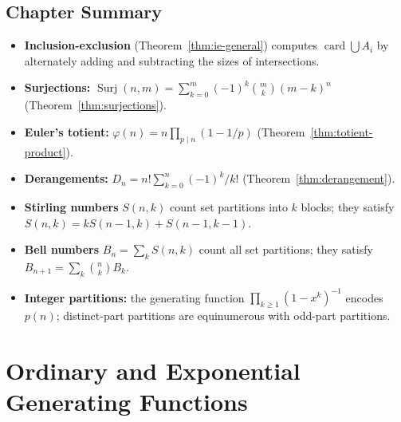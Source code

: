 \documentclass[12pt,a4paper,openany]{book}
\theoremstyle{definition}
\theoremstyle{plain}
\theoremstyle{remark}
\DeclareMathOperator{\card}{card}
\begin{document}

\section{Chapter Summary}\label{sec:ie-summary}

\begin{itemize}
  \item \textbf{Inclusion-exclusion} (Theorem~\ref{thm:ie-general})
    computes $\card{\bigcup A_i}$ by alternately adding and subtracting
    the sizes of intersections.

  \item \textbf{Surjections:} $\operatorname{Surj}(n,m) = \sum_{k=0}^m
    (-1)^k\binom{m}{k}(m-k)^n$ (Theorem~\ref{thm:surjections}).

  \item \textbf{Euler's totient:} $\varphi(n) = n\prod_{p\mid n}
    (1-1/p)$ (Theorem~\ref{thm:totient-product}).

  \item \textbf{Derangements:} $D_n = n!\sum_{k=0}^n(-1)^k/k!$
    (Theorem~\ref{thm:derangement}).

  \item \textbf{Stirling numbers} $S(n,k)$ count set partitions into
    $k$ blocks; they satisfy
    $S(n,k) = kS(n\!-\!1,k) + S(n\!-\!1,k\!-\!1)$.

  \item \textbf{Bell numbers} $B_n = \sum_k S(n,k)$ count all set
    partitions; they satisfy $B_{n+1}=\sum_k\binom{n}{k}B_k$.

  \item \textbf{Integer partitions:} the generating function
    $\prod_{k\ge 1}(1-x^k)^{-1}$ encodes $p(n)$; distinct-part
    partitions are equinumerous with odd-part partitions.
\end{itemize}



\chapter{Ordinary and Exponential Generating Functions}\label{ch:generating-functions}
\end{document}
